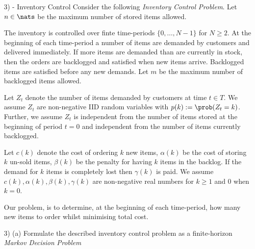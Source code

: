 \documentclass[11pt,a4paper]{article}
\begin{document}
\begin{question}{3) - Inventory Control}
  Consider the following \textit{Inventory Control Problem}. Let $n\in\nats$ be the maximum number of stored items allowed.
  \par The inventory is controlled over finte time-periods $\{0,\dots,N-1\}$ for $N\geq2$. At the beginning of each time-period a number of items are demanded by customers and delivered immediately. If more items are demanded than are currently in stock, then the orders are backlogged and satisfied when new items arrive. Backlogged items are satisfied before any new demands. Let $m$ be the maximum number of backlogged items allowed.
  \par Let $Z_t$ denote the number of items demanded by customers at time $t\in T$. We assume $Z_t$ are non-negative IID random variables with $p(k):=\prob(Z_t=k)$. Further, we assume $Z_t$ is independent from the number of items stored at the beginning of period $t=0$ and independent from the number of items currently backlogged.
  \par Let $c(k)$ denote the cost of ordering $k$ new items, $\alpha(k)$ be the cost of storing $k$ un-sold items, $\beta(k)$ be the penalty for having $k$ items in the backlog. If the demand for $k$ items is completely lost then $\gamma(k)$ is paid. We assume $c(k),\alpha(k),\beta(k),\gamma(k)$ are non-negative real numbers for $k\geq1$ and 0 when $k=0$.
  \par Our problem, is to determine, at the beginning of each time-period, how many new items to order whilst minimising total cost.
\end{question}

\begin{question}{3) (a)}
  Formulate the described inventory control problem as a finite-horizon \textit{Markov Decision Problem}
\end{question}
\end{document}
